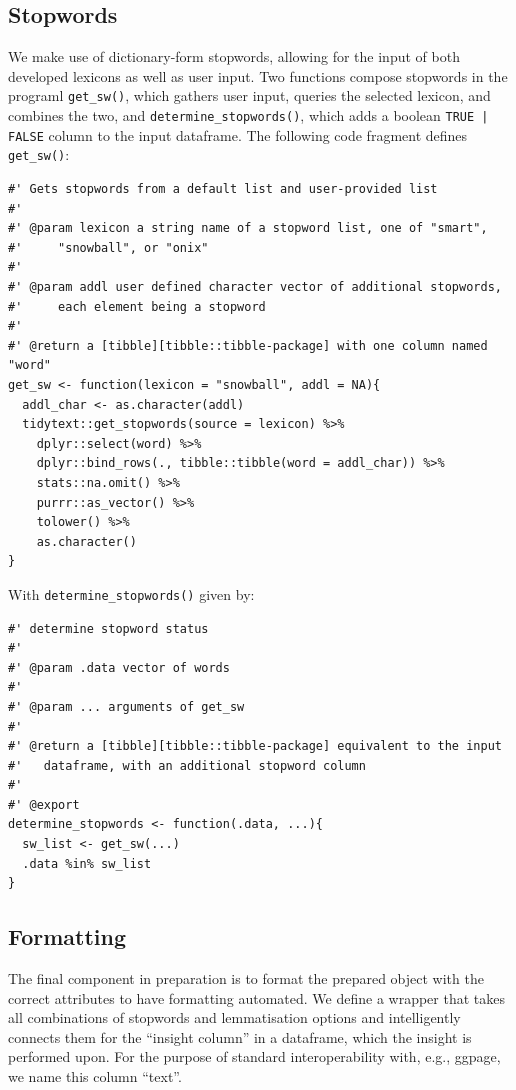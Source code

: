 \documentclass[11pt, a4paper, oneside]{report}
\begin{document}
\subsection{Stopwords}
\label{sec:stopwords}
We make use of dictionary-form stopwords, allowing for the input of
both developed lexicons as well as user input. Two functions compose stopwords in the programl \texttt{get_sw()}, which gathers user input, queries the selected lexicon, and combines the two, and \texttt{determine_stopwords()}, which adds a boolean \texttt{TRUE | FALSE} column to the input dataframe. The following code fragment defines \texttt{get_sw()}:
\begin{verbatim}
#' Gets stopwords from a default list and user-provided list
#'
#' @param lexicon a string name of a stopword list, one of "smart",
#'     "snowball", or "onix"
#'
#' @param addl user defined character vector of additional stopwords,
#'     each element being a stopword
#'
#' @return a [tibble][tibble::tibble-package] with one column named "word"
get_sw <- function(lexicon = "snowball", addl = NA){
  addl_char <- as.character(addl)
  tidytext::get_stopwords(source = lexicon) %>%
    dplyr::select(word) %>%
    dplyr::bind_rows(., tibble::tibble(word = addl_char)) %>%
    stats::na.omit() %>%
    purrr::as_vector() %>%
    tolower() %>%
    as.character()
}
\end{verbatim}

With \texttt{determine_stopwords()} given by:
\begin{verbatim}
#' determine stopword status
#'
#' @param .data vector of words
#'
#' @param ... arguments of get_sw
#'
#' @return a [tibble][tibble::tibble-package] equivalent to the input
#'   dataframe, with an additional stopword column
#'
#' @export
determine_stopwords <- function(.data, ...){
  sw_list <- get_sw(...)
  .data %in% sw_list
}
\end{verbatim}

\subsection{Formatting}
\label{sec:formatting}

The final component in preparation is to format the prepared object
with the correct attributes to have formatting automated. We define a
wrapper that takes all combinations of stopwords and lemmatisation
options and intelligently connects them for the ``insight column'' in
a dataframe, which the insight is performed upon. For the purpose of
standard interoperability with, e.g., ggpage, we name this column
``text''.
\end{document}
